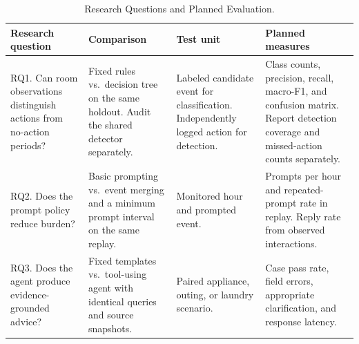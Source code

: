 \begin{table}[t]
\caption{Research Questions and Planned Evaluation.}
\label{tab:evaluation}
\centering\footnotesize
\begin{tabular}{@{}p{}p{}p{}p{}@{}}
\hline
Research question & Comparison & Test unit & Planned measures \\
\hline
RQ1. Can room observations distinguish actions from no-action periods? &
Fixed rules vs.\ decision tree on the same holdout. Audit the shared detector separately. &
Labeled candidate event for classification. Independently logged action for detection. &
Class counts, precision, recall, macro-F1, and confusion matrix. Report detection coverage and missed-action counts separately. \\
RQ2. Does the prompt policy reduce burden? &
Basic prompting vs.\ event merging and a minimum prompt interval on the same replay. &
Monitored hour and prompted event. &
Prompts per hour and repeated-prompt rate in replay. Reply rate from observed interactions. \\
RQ3. Does the agent produce evidence-grounded advice? &
Fixed templates vs.\ tool-using agent with identical queries and source snapshots. &
Paired appliance, outing, or laundry scenario. &
Case pass rate, field errors, appropriate clarification, and response latency. \\
\hline
\end{tabular}
\end{table}
